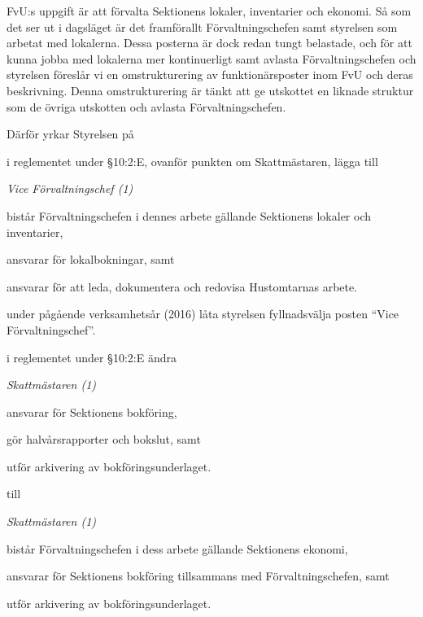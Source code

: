 \documentclass[../_main/handlingar.tex]{subfiles}
\begin{document}
FvU:s uppgift är att förvalta Sektionens lokaler, inventarier och ekonomi. Så som det ser ut i dagsläget är det framförallt Förvaltningschefen samt styrelsen som arbetat med lokalerna. Dessa posterna är dock redan tungt belastade, och för att kunna jobba med lokalerna mer kontinuerligt samt avlasta Förvaltningschefen och styrelsen föreslår vi en omstrukturering av funktionärsposter inom FvU och deras beskrivning.  Denna omstrukturering är tänkt att ge utskottet en liknade struktur som de övriga utskotten och avlasta Förvaltningschefen.

Därför yrkar Styrelsen på
\begin{attsatser}
    \att i reglementet under \S10:2:E, ovanför punkten om Skattmästaren, lägga till\par
    {\it
    Vice Förvaltningschef (1)
    \begin{tightdashlist}
        \item bistår Förvaltningschefen i dennes arbete gällande Sektionens lokaler och inventarier,
        \item ansvarar för lokalbokningar, samt
        \item ansvarar för att leda, dokumentera och redovisa Hustomtarnas arbete.
    \end{tightdashlist}
    }

    \att under pågående verksamhetsår (2016) låta styrelsen fyllnadsvälja posten ``Vice Förvaltningschef''.

    \att i reglementet under \S10:2:E ändra\par
    {\it
    Skattmästaren (1)
    \begin{tightdashlist}
        \item ansvarar för Sektionens bokföring,
        \item gör halvårsrapporter och bokslut, samt
        \item utför arkivering av bokföringsunderlaget.
    \end{tightdashlist}
    }
    till\par
    {\it
    Skattmästaren (1)
    \begin{tightdashlist}
        \item bistår Förvaltningschefen i dess arbete gällande Sektionens ekonomi,
        \item ansvarar för Sektionens bokföring tillsammans med Förvaltningschefen, samt
        \item utför arkivering av bokföringsunderlaget.
    \end{tightdashlist}
    }


\end{attsatser}
\end{document}
